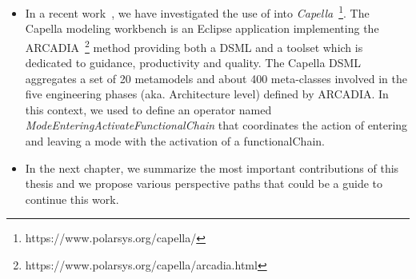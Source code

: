 \begin{itemize}
	\item In a recent work~\cite{combemaleerts16bib}, we have investigated the use of \bcool into \emph{Capella}~\footnote{https://www.polarsys.org/capella/}. The Capella modeling workbench is an Eclipse application implementing the ARCADIA~\footnote{https://www.polarsys.org/capella/arcadia.html} method providing both a DSML and a toolset which is dedicated to guidance, productivity and quality. The Capella DSML aggregates a set of 20 metamodels and about 400 meta-classes involved in the five engineering phases (aka. Architecture level) defined by ARCADIA. In this context, we used \bcool to define an operator named \emph{ModeEnteringActivateFunctionalChain} that coordinates the action of entering and leaving a mode with the activation of a functionalChain.
	
	\item In the next chapter, we summarize the most important contributions of this thesis and we propose various perspective paths that could be a guide to continue this work. 
	
\end{itemize}

 

